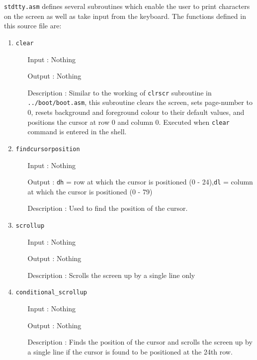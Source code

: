 \texttt{stdtty.asm} defines several subroutines which enable the user to print characters on the screen as well as take input from the keyboard. The functions defined in this source file are:
\begin{enumerate}
  \item \texttt{clear}
  		\begin{enumerate}[align=parleft, labelsep=2cm, leftmargin=1.06in]
  		  \item[Input]: Nothing
  		  \item[Output]: Nothing
  		  \item[Description]: Similar to the working of \texttt{clrscr} subroutine in \texttt{../boot/boot.asm}, this subroutine clears the screen, sets page-number to 0, resets background and foreground colour to their default values, and positions the cursor at row 0 and column 0. Executed when \texttt{clear} command is entered in the shell.
  		\end{enumerate}
  \item \texttt{findcursorposition}
  		\begin{enumerate}[align=parleft, labelsep=2cm, leftmargin=1.06in]
  		  \item[Input]: Nothing
  		  \item[Output]: \texttt{dh} = row at which the cursor is positioned (0 - 24),\newline\texttt{dl} = column at which the cursor is positioned (0 - 79)
  		  \item[Description]: Used to find the position of the cursor. 
  		\end{enumerate}
  \item \texttt{scrollup}
  		\begin{enumerate}[align=parleft, labelsep=2cm, leftmargin=1.06in]
  		  \item[Input]: Nothing
  		  \item[Output]: Nothing
  		  \item[Description]: Scrolls the screen up by a single line only
  		\end{enumerate}
  \item \texttt{conditional\_scrollup}
  		\begin{enumerate}[align=parleft, labelsep=2cm, leftmargin=1.06in]
  		  \item[Input]: Nothing
  		  \item[Output]: Nothing
  		  \item[Description]: Finds the position of the cursor and scrolls the screen up by a single line if the cursor is found to be positioned at the 24th row.

\end{enumerate}
\end{enumerate}
